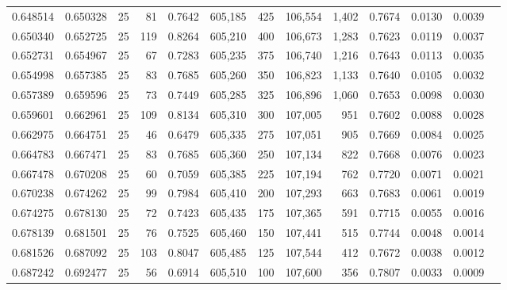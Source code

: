\begin{tabular}{rrrrrrrrrrrrr}
0.648514 & 0.650328 &    25 &  81 &                                     0.7642 & 605,185 &     425 & 106,554 &   1,402 & 0.7674 & 0.0130 & 0.0039 \\
0.650340 & 0.652725 &    25 & 119 &                                     0.8264 & 605,210 &     400 & 106,673 &   1,283 & 0.7623 & 0.0119 & 0.0037 \\
0.652731 & 0.654967 &    25 &  67 &                                     0.7283 & 605,235 &     375 & 106,740 &   1,216 & 0.7643 & 0.0113 & 0.0035 \\
0.654998 & 0.657385 &    25 &  83 &                                     0.7685 & 605,260 &     350 & 106,823 &   1,133 & 0.7640 & 0.0105 & 0.0032 \\
0.657389 & 0.659596 &    25 &  73 &                                     0.7449 & 605,285 &     325 & 106,896 &   1,060 & 0.7653 & 0.0098 & 0.0030 \\
0.659601 & 0.662961 &    25 & 109 &                                     0.8134 & 605,310 &     300 & 107,005 &     951 & 0.7602 & 0.0088 & 0.0028 \\
0.662975 & 0.664751 &    25 &  46 &                                     0.6479 & 605,335 &     275 & 107,051 &     905 & 0.7669 & 0.0084 & 0.0025 \\
0.664783 & 0.667471 &    25 &  83 &                                     0.7685 & 605,360 &     250 & 107,134 &     822 & 0.7668 & 0.0076 & 0.0023 \\
0.667478 & 0.670208 &    25 &  60 &                                     0.7059 & 605,385 &     225 & 107,194 &     762 & 0.7720 & 0.0071 & 0.0021 \\
0.670238 & 0.674262 &    25 &  99 &                                     0.7984 & 605,410 &     200 & 107,293 &     663 & 0.7683 & 0.0061 & 0.0019 \\
0.674275 & 0.678130 &    25 &  72 &                                     0.7423 & 605,435 &     175 & 107,365 &     591 & 0.7715 & 0.0055 & 0.0016 \\
0.678139 & 0.681501 &    25 &  76 &                                     0.7525 & 605,460 &     150 & 107,441 &     515 & 0.7744 & 0.0048 & 0.0014 \\
0.681526 & 0.687092 &    25 & 103 &                                     0.8047 & 605,485 &     125 & 107,544 &     412 & 0.7672 & 0.0038 & 0.0012 \\
0.687242 & 0.692477 &    25 &  56 &                                     0.6914 & 605,510 &     100 & 107,600 &     356 & 0.7807 & 0.0033 & 0.0009 \\

\end{tabular}
